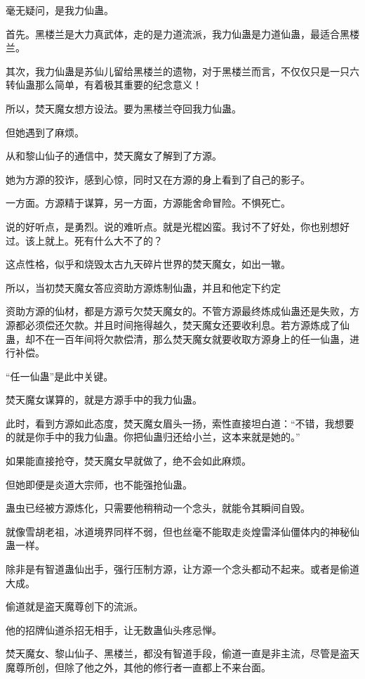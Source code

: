 \begin{this_body}
毫无疑问，是我力仙蛊。

首先。黑楼兰是大力真武体，走的是力道流派，我力仙蛊是力道仙蛊，最适合黑楼兰。

其次，我力仙蛊是苏仙儿留给黑楼兰的遗物，对于黑楼兰而言，不仅仅只是一只六转仙蛊那么简单，有着极其重要的纪念意义！

所以，焚天魔女想方设法。要为黑楼兰夺回我力仙蛊。

但她遇到了麻烦。

从和黎山仙子的通信中，焚天魔女了解到了方源。

她为方源的狡诈，感到心惊，同时又在方源的身上看到了自己的影子。

一方面。方源精于谋算，另一方面，方源能舍命冒险。不惧死亡。

说的好听点，是勇烈。说的难听点。就是光棍凶蛮。我讨不了好处，你也别想好过。该上就上。死有什么大不了的？

这点性格，似乎和烧毁太古九天碎片世界的焚天魔女，如出一辙。

所以，当初焚天魔女答应资助方源炼制仙蛊，并且和他定下约定

资助方源的仙材，都是方源亏欠焚天魔女的。不管方源最终炼成仙蛊还是失败，方源都必须偿还欠款。并且时间拖得越久，焚天魔女还要收利息。若方源炼成了仙蛊，却不在一百年间将欠款偿清，那么焚天魔女就要收取方源身上的任一仙蛊，进行补偿。

“任一仙蛊”是此中关键。

焚天魔女谋算的，就是方源手中的我力仙蛊。

此时，看到方源如此态度，焚天魔女眉头一扬，索性直接坦白道：“不错，我想要的就是你手中的我力仙蛊。你把仙蛊归还给小兰，这本来就是她的。”

如果能直接抢夺，焚天魔女早就做了，绝不会如此麻烦。

但她即便是炎道大宗师，也不能强抢仙蛊。

蛊虫已经被方源炼化，只需要他稍稍动一个念头，就能令其瞬间自毁。

就像雪胡老祖，冰道境界同样不弱，但也丝毫不能取走炎煌雷泽仙僵体内的神秘仙蛊一样。

除非是有智道蛊仙出手，强行压制方源，让方源一个念头都动不起来。或者是偷道大成。

偷道就是盗天魔尊创下的流派。

他的招牌仙道杀招无相手，让无数蛊仙头疼忌惮。

焚天魔女、黎山仙子、黑楼兰，都没有智道手段，偷道一直是非主流，尽管是盗天魔尊所创，但除了他之外，其他的修行者一直都上不来台面。


\end{this_body}
